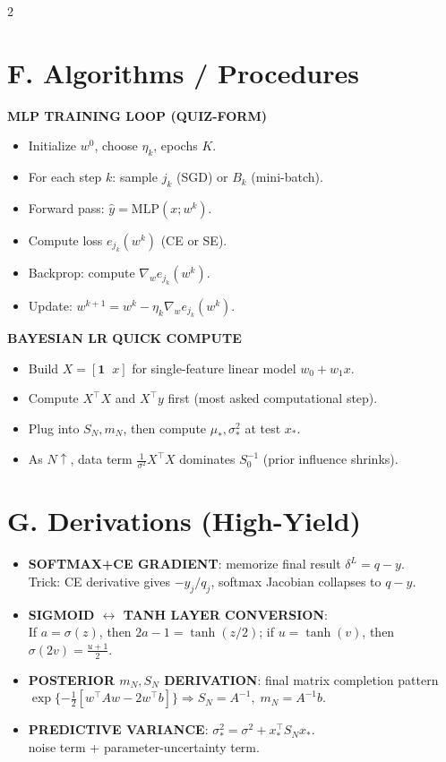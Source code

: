 \documentclass[10pt,fleqn]{article}
\begin{document}
\begin{multicols}{2}
\section*{F. Algorithms / Procedures}
\textbf{MLP TRAINING LOOP (QUIZ-FORM)}
\begin{itemize}
  \item Initialize \(w^0\), choose \(\eta_k\), epochs \(K\).
  \item For each step \(k\): sample \(j_k\) (SGD) or \(B_k\) (mini-batch).
  \item Forward pass: \(\hat y=\mathrm{MLP}(x;w^k)\).
  \item Compute loss \(e_{j_k}(w^k)\) (CE or SE).
  \item Backprop: compute \(\nabla_w e_{j_k}(w^k)\).
  \item Update: \(w^{k+1}=w^k-\eta_k\nabla_w e_{j_k}(w^k)\).
\end{itemize}

\textbf{BAYESIAN LR QUICK COMPUTE}
\begin{itemize}
  \item Build \(X=[\mathbf{1}\;\;x]\) for single-feature linear model \(w_0+w_1x\).
  \item Compute \(X^\top X\) and \(X^\top y\) first (most asked computational step).
  \item Plug into \(S_N,m_N\), then compute \(\mu_*,\sigma_*^2\) at test \(x_*\).
  \item As \(N\uparrow\), data term \(\frac1{\sigma^2}X^\top X\) dominates \(S_0^{-1}\) (prior influence shrinks).
\end{itemize}

\section*{G. Derivations (High-Yield)}
\begin{itemize}
  \item \textbf{SOFTMAX+CE GRADIENT}: memorize final result \(\delta^L=q-y\).\\
  Trick: CE derivative gives \(-y_j/q_j\), softmax Jacobian collapses to \(q-y\).
  \item \textbf{SIGMOID \(\leftrightarrow\) TANH LAYER CONVERSION}:\\
  If \(a=\sigma(z)\), then \(2a-1=\tanh(z/2)\); if \(u=\tanh(v)\), then \(\sigma(2v)=\frac{u+1}{2}\).
  \item \textbf{POSTERIOR \(m_N,S_N\) DERIVATION}: final matrix completion pattern\\
  \(\exp\{-\frac12[w^\top A w-2w^\top b]\}\Rightarrow S_N=A^{-1},\; m_N=A^{-1}b\).
  \item \textbf{PREDICTIVE VARIANCE}: \(\sigma_*^2=\sigma^2+x_*^\top S_Nx_*\).\\
  noise term + parameter-uncertainty term.
\end{itemize}


\end{multicols}
\end{document}
